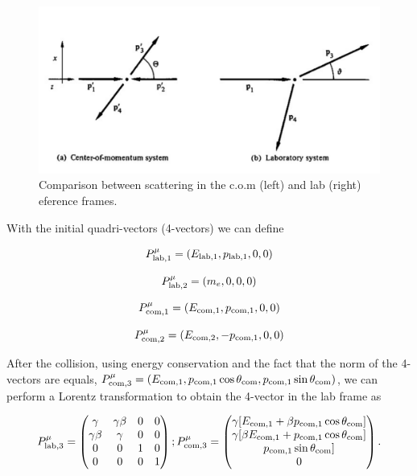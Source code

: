 \documentclass[10pt,swedish, openany]{book}
\begin{document}
\begin{figure}[H]
\includegraphics[scale=0.5]{ScatteringTwoFrames.png}
\centering
\caption{Comparison between scattering in the c.o.m (left) and lab (right) eference frames.}
\label{fig:lab}
\end{figure}

With the initial quadri-vectors (4-vectors) we can define

\begin{equation}
    P^{\mu}_{\rm lab,1} = (E_{\rm lab,1},p_{\rm lab,1},0,0)
\end{equation}

\begin{equation}
    P^{\mu}_{\rm lab,2} = (m_e,0,0,0)
\end{equation}

\begin{equation}
    P^{\mu}_{\rm com,1} = (E_{\rm com,1},p_{\rm com,1},0,0)
\end{equation}

\begin{equation}
    P^{\mu}_{\rm com,2} = (E_{\rm com,2},-p_{\rm com,1},0,0)
\end{equation}

After the collision, using energy conservation and the fact that the norm of the 4-vectors are equals, $P^{\mu}_{\rm com,3} = (E_{\rm com,1},p_{\rm com,1}\cos{\theta_{\rm com}},p_{\rm com,1}\sin{\theta_{\rm com}})$, we can perform a Lorentz transformation to obtain the 4-vector in the lab frame as

\begin{equation}
P^{\mu}_{\rm lab,3} = \begin{pmatrix}
\gamma & \gamma\beta & 0 & 0 \\
\gamma\beta & \gamma & 0 & 0\\
0 & 0 & 1 & 0\\
0 & 0 & 0 & 1
\end{pmatrix};
P^{\mu}_{\rm com,3} = \begin{pmatrix}
\gamma[E_{\rm com,1}+\beta p_{\rm com,1}\cos{\theta_{\rm com}}]\\
\gamma[\beta E_{\rm com,1}+ p_{\rm com,1}\cos{\theta_{\rm com}}]\\
p_{\rm com,1}\sin{\theta_{\rm com}}]\\
0
\end{pmatrix}.
\end{equation}
\end{document}
